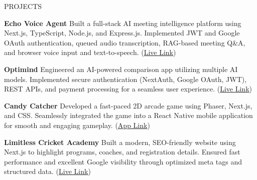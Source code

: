 \documentclass{resume} %
\begin{document}
\begin{rSection}{PROJECTS}
\renewcommand{\baselinestretch}{1.2}\normalsize
\vspace{-1.25em}
\item \textbf{Echo Voice Agent} {Built a full-stack AI meeting intelligence platform using Next.js, TypeScript, Node.js, and Express.js. Implemented JWT and Google OAuth authentication, queued audio transcription, RAG-based meeting Q\&A, and browser voice input and text-to-speech. (\href{https://echo-voice-agent-frontend.vercel.app/}{Live Link})}

\item \textbf{Optimind} {Engineered an AI-powered comparison app utilizing multiple AI models. Implemented secure authentication (NextAuth, Google OAuth, JWT), REST APIs, and payment processing for a seamless user experience. (\href{https://optimind-two.vercel.app/}{Live Link})}

\item \textbf{Candy Catcher} {Developed a fast-paced 2D arcade game using Phaser, Next.js, and CSS. Seamlessly integrated the game into a React Native mobile application for smooth and engaging gameplay. (\href{https://expo.dev/accounts/asitsingh18/projects/gameshub/builds/fbe000b3-6841-4ee9-8ef2-e55ef19db264}{App Link})}

\item \textbf{Limitless Cricket Academy} {Built a modern, SEO-friendly website using Next.js to highlight programs, coaches, and registration details. Ensured fast performance and excellent Google visibility through optimized meta tags and structured data. (\href{https://www.limitlesscricketacademy.com/}{Live Link})}
\end{rSection}


\end{document}

